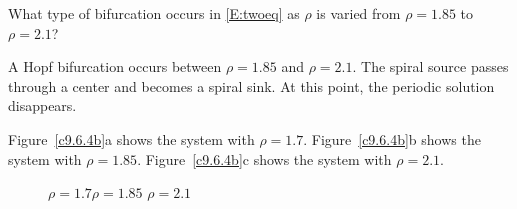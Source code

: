 \documentclass{ximera}
\begin{document}
\begin{exercise} \label{c9.6.4c}
What type of bifurcation occurs in \eqref{E:twoeq} as $\rho$ is varied
from $\rho=1.85$ to $\rho=2.1$?

\begin{solution}
A Hopf bifurcation occurs between $\rho = 1.85$ and
$\rho = 2.1$.  The spiral source passes through a center and becomes a
spiral sink.  At this point, the periodic solution disappears.

Figure~\ref{c9.6.4b}a shows the system with $\rho = 1.7$.
Figure~\ref{c9.6.4b}b shows the system with $\rho = 1.85$.
Figure~\ref{c9.6.4b}c shows the system with $\rho = 2.1$.

\begin{figure}[htb]
                       \centerline{%
                       }
		\centerline{$\rho = 1.7$\hspace{1.3in}$\rho = 1.85$
\hspace{1.3in}$\rho = 2.1$}
\end{figure}


\end{solution}
\end{exercise}
\end{document}
